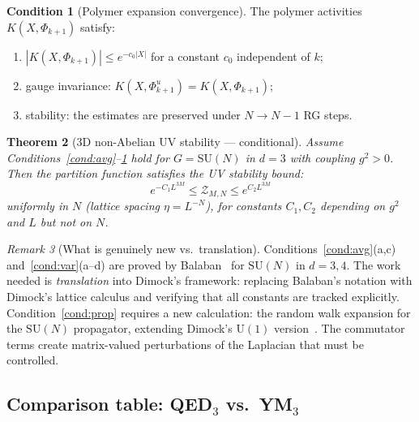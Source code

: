 \documentclass[11pt,a4paper]{article}
\theoremstyle{plain}
\newtheorem{theorem}{Theorem}[section]
\theoremstyle{definition}
\newtheorem{condition}[theorem]{Condition}
\theoremstyle{remark}
\newtheorem{remark}[theorem]{Remark}
\newcommand{\SU}{\mathrm{SU}}
\newcommand{\U}{\mathrm{U}}
\newcommand{\cZ}{\mathcal{Z}}
\begin{document}
\begin{condition}[Polymer expansion convergence]
\label{cond:poly}
The polymer activities $K(X, \Phi_{k+1})$
satisfy:
\begin{enumerate}[label=(\alph*),nosep]
  \item $|K(X, \Phi_{k+1})| \le e^{-c_0 |X|}$
    for a constant $c_0$ independent of $k$;
  \item gauge invariance: $K(X, \Phi_{k+1}^u) =
    K(X, \Phi_{k+1})$;
  \item stability: the estimates are preserved
    under $N \to N-1$ RG steps.
\end{enumerate}
\end{condition}

\begin{theorem}[3D non-Abelian UV stability ---
  conditional]\label{thm:3d_uv}
Assume Conditions~\ref{cond:avg}--\ref{cond:poly}
hold for $G = \SU(N)$ in $d = 3$ with coupling
$g^2 > 0$. Then the partition function
satisfies the UV stability bound:
\begin{equation}
  e^{-C_1 L^{3M}} \le \cZ_{M,N}
  \le e^{C_2 L^{3M}}
\end{equation}
uniformly in $N$ (lattice spacing $\eta = L^{-N}$),
for constants $C_1, C_2$ depending on $g^2$ and $L$
but not on $N$.
\end{theorem}

\begin{remark}[What is genuinely new vs.\ translation]
  Conditions~\ref{cond:avg}(a,c) and~\ref{cond:var}(a--d)
  are proved by Balaban~\cite{Bal85a,Bal85d} for $\SU(N)$
  in $d = 3,4$. The work needed is \emph{translation}
  into Dimock's framework: replacing Balaban's notation
  with Dimock's lattice calculus and verifying that
  all constants are tracked explicitly.
  Condition~\ref{cond:prop} requires a new calculation:
  the random walk expansion for the $\SU(N)$ propagator,
  extending Dimock's $\U(1)$ version~\cite{Dimock22}.
  The commutator terms create matrix-valued perturbations
  of the Laplacian that must be controlled.
\end{remark}

\subsection{Comparison table: QED$_3$ vs.\ YM$_3$}
\end{document}
